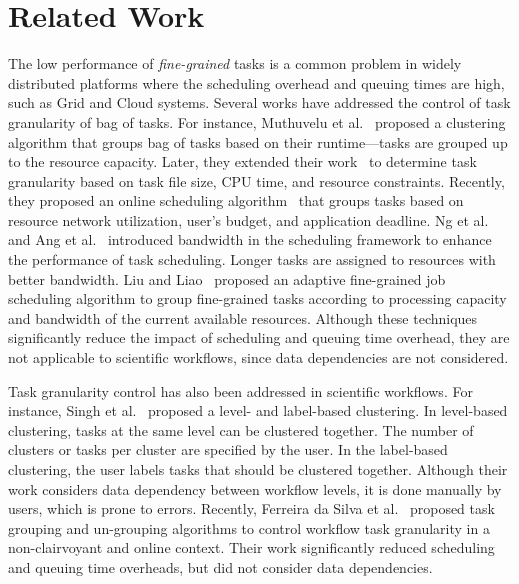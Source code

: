 \documentclass[final]{IEEEtran}
\begin{document}
\section{Related Work}

The low performance of \emph{fine-grained} tasks is a common problem in widely distributed platforms where the scheduling overhead and queuing times are high, such as Grid and Cloud systems. Several works have addressed the control of task granularity of bag of tasks. For instance, Muthuvelu et al.~\cite{Muthuvelu:2005:DJG:1082290.1082297} proposed a clustering algorithm that groups bag of tasks based on their runtime---tasks are grouped up to the resource capacity. Later, they extended their work~\cite{4493929} to determine task granularity based on task file size, CPU time, and resource constraints. Recently, they proposed an online scheduling algorithm~\cite{Muthuvelu2010,Muthuvelu2013170} that groups tasks based on resource network utilization, user's budget, and application deadline. Ng et al.~\cite{keat-2006} and Ang et al.~\cite{ang-2009} introduced bandwidth in the scheduling framework to enhance the performance of task scheduling. Longer tasks are assigned to resources with better bandwidth. Liu and Liao~\cite{4958835} proposed an adaptive fine-grained job scheduling algorithm to group fine-grained tasks according to processing capacity and bandwidth of the current available resources. Although these techniques significantly reduce the impact of scheduling and queuing time overhead, they are not applicable to scientific workflows, since data dependencies are not considered.

Task granularity control has also been addressed in scientific workflows. For instance, Singh et al.~\cite{Singh:2008:WTC:1341811.1341822} proposed a level- and label-based clustering. In level-based clustering, tasks at the same level can be clustered together. The number of clusters or tasks per cluster are specified by the user. In the label-based clustering, the user labels tasks that should be clustered together. Although their work considers data dependency between workflow levels, it is done manually by users, which is prone to errors. Recently, Ferreira da Silva et al.~\cite{europar-granularity} proposed task grouping and un-grouping algorithms to control workflow task granularity in a non-clairvoyant and online context. Their work significantly reduced scheduling and queuing time overheads, but did not consider data dependencies.


\end{document}
